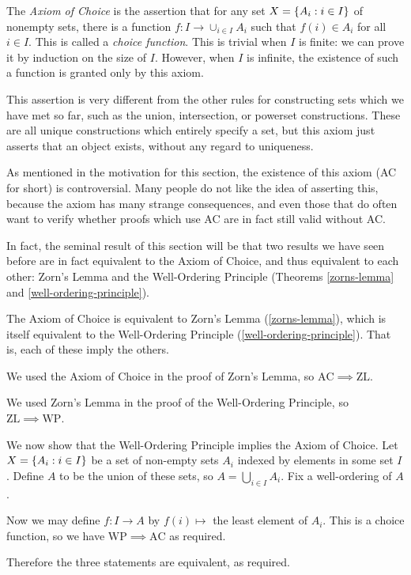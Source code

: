 \documentclass{article}
\begin{document}
The \textit{Axiom of Choice} is the assertion that for any set $X = \left\lbrace A_i : i \in I \right\rbrace$ of nonempty sets, there is a function $f : I \to \cup_{i \in I} A_i$ such that $f(i) \in A_i$ for all $i \in I$. This is called a \textit{choice function}. This is trivial when $I$ is finite: we can prove it by induction on the size of $I$. However, when $I$ is infinite, the existence of such a function is granted only by this axiom.

\begin{note}
	This assertion is very different from the other rules for constructing sets which we have met so far, such as the union, intersection, or powerset constructions. These are all unique constructions which entirely specify a set, but this axiom just asserts that an object exists, without any regard to uniqueness.
\end{note}

\begin{note}
	As mentioned in the motivation for this section, the existence of this axiom (AC for short) is controversial. Many people do not like the idea of asserting this, because the axiom has many strange consequences, and even those that do often want to verify whether proofs which use AC are in fact still valid without AC.
\end{note}

In fact, the seminal result of this section will be that two results we have seen before are in fact equivalent to the Axiom of Choice, and thus equivalent to each other: Zorn's Lemma and the Well-Ordering Principle (Theorems \ref{zorns-lemma} and \ref{well-ordering-principle}).

\begin{theorem}
    The Axiom of Choice is equivalent to Zorn's Lemma (\ref{zorns-lemma}), which is itself equivalent to the Well-Ordering Principle (\ref{well-ordering-principle}). That is, each of these imply the others.
\end{theorem}

\begin{prf}
    We used the Axiom of Choice in the proof of Zorn's Lemma, so $\mathrm{AC} \implies \mathrm{ZL}$.
    
    We used Zorn's Lemma in the proof of the Well-Ordering Principle, so $\mathrm{ZL} \implies \mathrm{WP}$.
    
    We now show that the Well-Ordering Principle implies the Axiom of Choice. Let $X = \left\lbrace A_i : i \in I \right\rbrace$ be a set of non-empty sets $A_i$ indexed by elements in some set $I$. Define $A$ to be the union of these sets, so $A = \bigcup_{i \in I} A_i$. Fix a well-ordering of $A$.
    
    Now we may define $f : I \to A$ by $f(i) \mapsto$ the least element of $A_i$. This is a choice function, so we have $\mathrm{WP} \implies \mathrm{AC}$ as required.
    
    Therefore the three statements are equivalent, as required.
\end{prf}
\end{document}
